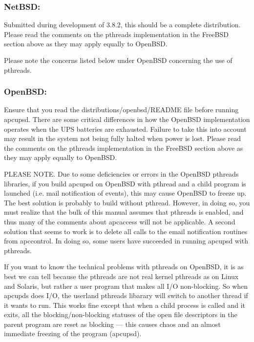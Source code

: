 \label{NetBSD}

\subsubsection*{NetBSD:}

\label{index-NetBSD-40}
\label{index-OS_002c-NetBSD-41}
Submitted during development of 3.8.2, this should be a complete distribution.
Please read the comments on the pthreads implementation in the FreeBSD
section above as they may apply equally to OpenBSD.  

Please note the concerns listed below under OpenBSD concerning the use of
pthreads. 

\label{OpenBSD}

\subsubsection*{OpenBSD:}

\label{index-OpenBSD-42}
\label{index-OS_002c-OpenBSD-43}
Ensure that you read the distributions/openbsd/README file before running
apcupsd. There are some critical differences in how the OpenBSD implementation
operates when the UPS batteries are exhausted. Failure to take this into
account may result in the system not being fully halted when power is lost. 
Please read the comments on the pthreads implementation in the FreeBSD section
above as they may apply equally to OpenBSD.  

PLEASE NOTE. Due to some deficiencies or errors in the OpenBSD pthreads
libraries, if you build apcupsd on OpenBSD with pthread and a child program is
launched (i.e. mail notification of events), this may cause OpenBSD to freeze
up. The best solution is probably to build without pthread. However, in doing
so, you must realize that the bulk of this manual assumes that pthreads is
enabled, and thus many of the comments about apcaccess will not be applicable.
A second solution that seems to work is to delete all calls to the email
notification routines from apccontrol. In doing so, some users have succeeded
in running apcupsd with pthreads.  

If you want to know the technical problems with pthreads on OpenBSD, it is as
best we can tell because the pthreads are not real kernel pthreads as on Linux
and Solaris, but rather a user program that makes all I/O non-blocking. So
when apcupds does I/O, the userland pthreads libarary will switch to another
thread if it wants to run. This works fine except that when a child process is
called and it exits, all the blocking/non-blocking statuses of the open file
descriptors in the parent program are reset as blocking {---} this causes
chaos and an almost immediate freezing of the program (apcupsd). 

